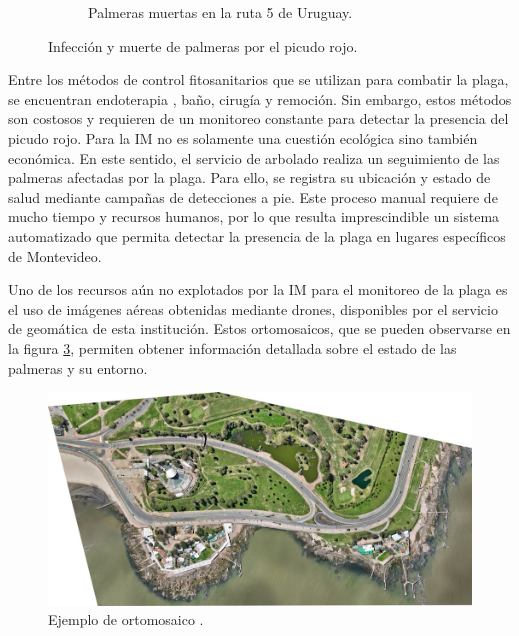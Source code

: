 \begin{figure}[htpb]
\begin{subfigure}[b]{0.49\textwidth}
    \caption{Palmeras muertas en la ruta 5 de Uruguay.}
    \label{fig:palmeras-ruta5}
  \end{subfigure}
  \caption{Infección y muerte de palmeras por el picudo rojo.}
  \label{fig:infeccion-y-muerte-palmeras}
\end{figure}

Entre los métodos de control fitosanitarios que se utilizan para combatir la plaga, se encuentran endoterapia \citep{intendencia_de_montevideo_acciones_nodate}, baño, cirugía \citep{sanchez_cirugiespecializada_nodate} y remoción. Sin embargo, estos métodos son costosos y requieren de un monitoreo constante para detectar la presencia del picudo rojo. Para la IM no es solamente una cuestión ecológica sino también económica. En este sentido, el servicio de arbolado realiza un seguimiento de las palmeras afectadas por la plaga. Para ello, se registra su ubicación y estado de salud mediante campañas de detecciones a pie. Este proceso manual requiere de mucho tiempo y recursos humanos, por lo que resulta imprescindible un sistema automatizado que permita detectar la presencia de la plaga en lugares específicos de Montevideo.

Uno de los recursos aún no explotados por la IM para el monitoreo de la plaga es el uso de imágenes aéreas obtenidas mediante drones, disponibles por el servicio de geomática de esta institución. Estos ortomosaicos, que se pueden observarse en la figura \ref{fig:ejemplo-ortomosaico}, permiten obtener información detallada sobre el estado de las palmeras y su entorno.

\begin{figure}[H]
  \centering
  \includegraphics[scale=0.5]{./Figures/ejemplo-ortomosaico.jpg}
  \caption{Ejemplo de ortomosaico \protect\footnotemark.}
  \label{fig:ejemplo-ortomosaico}
\end{figure}

